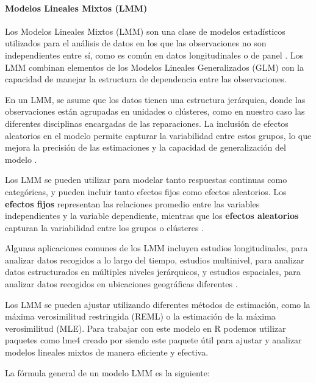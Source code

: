 \documentclass[
  11pt,
  bookmarksnumbered]{article}
\begin{document}
\hypertarget{modelos-lineales-mixtos-lmm}{%
\paragraph{Modelos Lineales Mixtos (LMM)}\label{modelos-lineales-mixtos-lmm}}

Los Modelos Lineales Mixtos (LMM) son una clase de modelos estadísticos utilizados para el análisis de datos en los que las observaciones no son independientes entre sí, como es común en datos longitudinales o de panel \textcite{pinheiro2000mixed}.
Los LMM combinan elementos de los Modelos Lineales Generalizados (GLM) con la capacidad de manejar la estructura de dependencia entre las observaciones.

En un LMM, se asume que los datos tienen una estructura jerárquica, donde las observaciones están agrupadas en unidades o clústeres, como en nuestro caso las diferentes disciplinas encargadas de las reparaciones.
La inclusión de efectos aleatorios en el modelo permite capturar la variabilidad entre estos grupos, lo que mejora la precisión de las estimaciones y la capacidad de generalización del modelo \textcite{gelman2006data}.

Los LMM se pueden utilizar para modelar tanto respuestas continuas como categóricas, y pueden incluir tanto efectos fijos como efectos aleatorios.
Los \textbf{efectos fijos} representan las relaciones promedio entre las variables independientes y la variable dependiente, mientras que los \textbf{efectos aleatorios} capturan la variabilidad entre los grupos o clústeres \textcite{gelman2006data}.

Algunas aplicaciones comunes de los LMM incluyen estudios longitudinales, para analizar datos recogidos a lo largo del tiempo, estudios multinivel, para analizar datos estructurados en múltiples niveles jerárquicos, y estudios espaciales, para analizar datos recogidos en ubicaciones geográficas diferentes \textcite{gelman2006data}.

Los LMM se pueden ajustar utilizando diferentes métodos de estimación, como la máxima verosimilitud restringida (REML) o la estimación de la máxima verosimilitud (MLE).
Para trabajar con este modelo en R podemos utilizar paquetes como lme4 creado por \textcite{bates2015lme4} siendo este paquete útil para ajustar y analizar modelos lineales mixtos de manera eficiente y efectiva.

La fórmula general de un modelo LMM es la siguiente:

\end{document}
